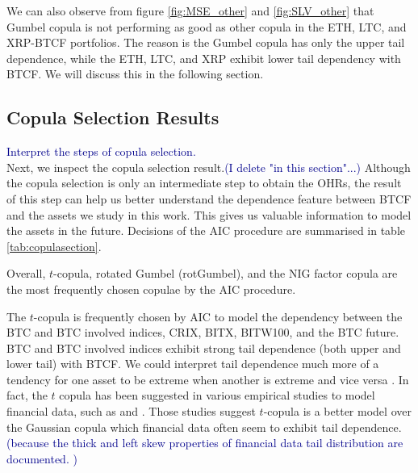We can also observe from figure \ref{fig:MSE_other} and \ref{fig:SLV_other} that Gumbel copula is not performing as good as other copula in the ETH, LTC, and XRP-BTCF portfolios.
The reason is the Gumbel copula has only the upper tail dependence, while the ETH, LTC, and XRP exhibit lower tail dependency with BTCF.
We will discuss this in the following section. \medskip

\subsection{Copula Selection Results}\label{sec: copula results}


\textcolor{darkblue}{Interpret the steps of copula selection.} \\
Next, we inspect the copula selection result.\textcolor{darkblue}{(I delete "in this section"...)}
Although the copula selection is only an intermediate step to obtain the OHRs,
the result of this step can help us better understand the dependence feature between BTCF and the assets we study in this work.
This gives us valuable information to model the assets in the future.
Decisions of the AIC procedure are summarised in table \ref{tab:copulasection}. \medskip

Overall, $t$-copula, rotated Gumbel (rotGumbel), and the NIG factor copula are the most frequently chosen copulae by the AIC procedure. \medskip

The $t$-copula is frequently chosen by AIC to model the dependency between the BTC and BTC involved indices, CRIX, BITX, BITW100, and the BTC future.
BTC and BTC involved indices exhibit strong tail dependence (both upper and lower tail) with BTCF.
We could interpret tail dependence much more of a tendency for one asset to be extreme when another is extreme and vice versa \citep{McNeil2015}.
In fact, the $t$ copula has been suggested in various empirical studies to model financial data, such as \cite{zeevi2002beyond} and \cite{breymann2003dependence}.
Those studies suggest $t$-copula is a better model over the Gaussian copula which financial data often seem to exhibit tail dependence. \textcolor{darkblue}{(because the thick and left skew properties of financial data tail distribution are documented. )} \medskip

